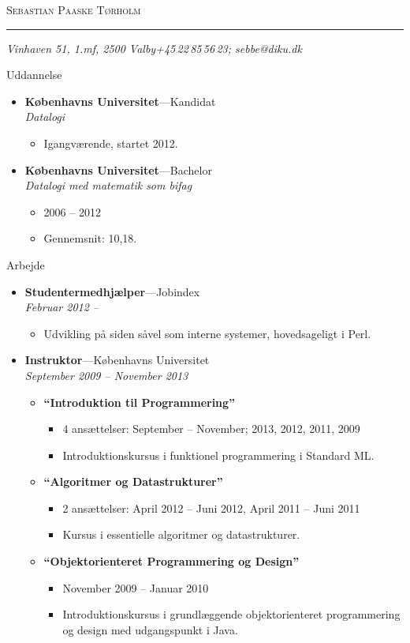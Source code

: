 \documentclass[11pt,oneside,a4paper]{article}
\makeatletter
\newcommand{\name}{Sebastian Paaske Tørholm}
\newcommand{\addr}{Vinhaven 51, 1.mf, 2500 Valby}
\newcommand{\phone}{+45\,22\,85\,56\,23}
\newcommand{\email}{sebbe@diku.dk}
\newcommand{\bigname}[1]{
	\begin{center}\fontfamily{phv}\selectfont\Huge\scshape#1\end{center}
}
\newenvironment{ressection}[1]{
	\vspace{4pt}
	{\fontfamily{phv}\selectfont\Large#1}
	\begin{itemize}
	\vspace{3pt}
}{
	\end{itemize}
}
\newcommand{\resitem}[1]{
	\vspace{-4pt}
	\item \begin{flushleft} #1 \end{flushleft}
}
\newcommand{\ressubitem}[1]{
	\vspace{-1pt}
	\item \begin{flushleft} #1 \end{flushleft}
}
\newcommand{\resbigitem}[3]{
	\vspace{-5pt}
	\item
	\textbf{#1}---#2 \\
	\textit{#3}
}
\newenvironment{ressubsec}[3]{
	\resbigitem{#1}{#2}{#3}
	\vspace{-2pt}
	\begin{itemize}
}{
	\end{itemize}
}
\newenvironment{reslist}[1]{
	\resitem{\textbf{#1}}
	\vspace{-2pt}
	\begin{itemize}
}{
	\end{itemize}
}
\makeatother
\begin{document}
 \selectfont

\bigname{\name}

\vspace{-8pt} \rule{\textwidth}{1pt}

\vspace{-1pt} {\small\itshape \addr \hfill \phone; \email}

\vspace{8 pt}




\begin{ressection}{Uddannelse}
	\begin{ressubsec}{Københavns Universitet}{Kandidat}{Datalogi}
		\ressubitem{Igangværende, startet 2012.}
	\end{ressubsec}

	\begin{ressubsec}{Københavns Universitet}{Bachelor}{Datalogi med matematik som bifag}
		\ressubitem{2006 -- 2012}
		\ressubitem{Gennemsnit: 10,18.}
	\end{ressubsec}

\end{ressection}


\begin{ressection}{Arbejde}
	\begin{ressubsec}{Studentermedhjælper}{Jobindex}{Februar 2012 -- }
		\ressubitem{Udvikling på siden såvel som interne systemer, hovedsageligt i Perl.}
	\end{ressubsec}

    \begin{ressubsec}{Instruktor}{Københavns Universitet}{September 2009 -- November 2013}
        \begin{reslist}{``Introduktion til Programmering''}
            \ressubitem{4 ansættelser: September -- November; 2013, 2012, 2011, 2009}
            \ressubitem{Introduktionskursus i funktionel programmering i Standard ML.}
        \end{reslist}
        \begin{reslist}{``Algoritmer og Datastrukturer''}
            \ressubitem{2 ansættelser: April 2012 -- Juni 2012, April 2011 -- Juni 2011}
            \ressubitem{Kursus i essentielle algoritmer og datastrukturer.}
        \end{reslist}
        \begin{reslist}{``Objektorienteret Programmering og Design''}
            \ressubitem{November 2009 -- Januar 2010}
            \ressubitem{Introduktionskursus i grundlæggende objektorienteret programmering og design med udgangspunkt i Java.}
        \end{reslist}
    \end{ressubsec}

\end{ressection}
\end{document}
